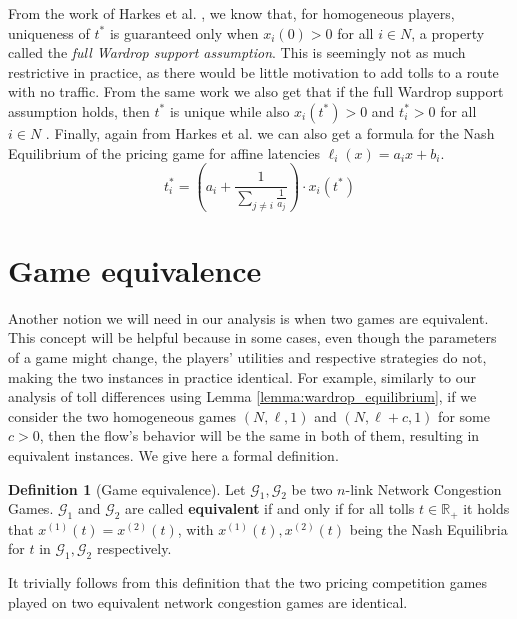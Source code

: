 \documentclass[10pt,a4paper]{book}
\newcommand{\R}{\mathbb{R}}
\newcommand{\Gm}{\mathcal{G}}
\theoremstyle{definition}
\newtheorem{definition}{Definition}[chapter]
\theoremstyle{comment}
\begin{document}
From the work of Harkes et al. \cite[Example 4.2]{Harks_2019}, we know that, for homogeneous players, uniqueness of $t^*$ is guaranteed only when $x_i(0) > 0$ for all $i \in N$, a property called the \textit{full Wardrop support assumption}.
This is seemingly not as much restrictive in practice, as there would be little motivation to add tolls to a route with no traffic.
From the same work we also get that if the full Wardrop support assumption holds, then $t^*$ is unique \cite[Lemma 3.3]{Harks_2019} while also $x_i(t^*) > 0$ and $t_i^* > 0$ for all $i \in N$ \cite[Lemma 3.2]{Harks_2019}.
Finally, again from Harkes et al. \cite[Lemma 3.3]{Harks_2019} we can also get a formula for the Nash Equilibrium of the pricing game for affine latencies $\ell_i(x) = a_i x + b_i$.
\begin{equation}
	\label{eq:homogeneous_pricing_ne_i}
	t_i^* = \left(a_i + \frac{1}{\sum_{j \ne i} \frac{1}{a_j}}\right) \cdot x_i(t^*)
\end{equation}

\section*{Game equivalence}

Another notion we will need in our analysis is when two games are equivalent.
This concept will be helpful because in some cases, even though the parameters of a game might change, the players' utilities and respective strategies do not, making the two instances in practice identical.
For example, similarly to our analysis of toll differences using Lemma \ref{lemma:wardrop_equilibrium}, if we consider the two homogeneous games $(N, \ell, 1)$ and $(N, \ell + c, 1)$ for some $c > 0$, then the flow's behavior will be the same in both of them, resulting in equivalent instances.
We give here a formal definition.

\begin{definition}[Game equivalence]
	\label{definition:game_equivalence}
	Let $\Gm_1, \Gm_2$ be two $n$-link Network Congestion Games.
	$\Gm_1$ and $\Gm_2$ are called \textbf{equivalent} if and only if for all tolls $t \in \R_+$ it holds that $x^{(1)}(t) = x^{(2)}(t)$, with $x^{(1)}(t), x^{(2)}(t)$ being the Nash Equilibria for $t$ in $\Gm_1, \Gm_2$ respectively.
\end{definition}

It trivially follows from this definition that the two pricing competition games played on two equivalent network congestion games are identical.
\end{document}
